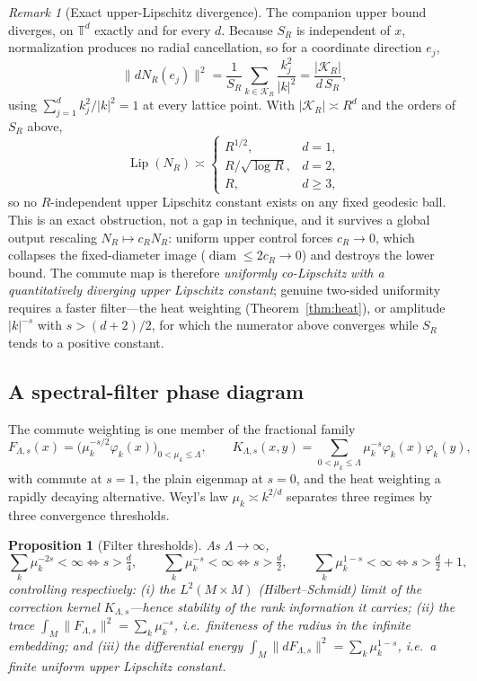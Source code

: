 \documentclass[11pt]{article}
\newtheorem{proposition}[theorem]{Proposition}
\theoremstyle{remark}
\newtheorem*{remark}{Remark}
\begin{document}
\begin{remark}[Exact upper-Lipschitz divergence]\label{rem:torus-upper}
The companion upper bound diverges, on $\mathbb T^d$ exactly and for every $d$.
Because $S_R$ is independent of $x$, normalization produces no radial cancellation,
so for a coordinate direction $e_j$,
\[
\lVert dN_R(e_j)\rVert^2=\frac1{S_R}\sum_{k\in\mathcal K_R}\frac{k_j^2}{\lvert k\rvert^2}
=\frac{\lvert\mathcal K_R\rvert}{d\,S_R},
\]
using $\sum_{j=1}^d k_j^2/\lvert k\rvert^2=1$ at every lattice point. With
$\lvert\mathcal K_R\rvert\asymp R^d$ and the orders of $S_R$ above,
\[
\operatorname{Lip}(N_R)\asymp
\begin{cases}
R^{1/2}, & d=1,\\
R/\sqrt{\log R}, & d=2,\\
R, & d\ge3,
\end{cases}
\]
so no $R$-independent upper Lipschitz constant exists on any fixed geodesic ball.
This is an exact obstruction, not a gap in technique, and it survives a global
output rescaling $N_R\mapsto c_RN_R$: uniform upper control forces $c_R\to0$, which
collapses the fixed-diameter image ($\operatorname{diam}\le2c_R\to0$) and destroys
the lower bound. The commute map is therefore \emph{uniformly co-Lipschitz with a
quantitatively diverging upper Lipschitz constant}; genuine two-sided uniformity
requires a faster filter---the heat weighting (Theorem~\ref{thm:heat}), or amplitude
$\lvert k\rvert^{-s}$ with $s>(d+2)/2$, for which the numerator above converges while
$S_R$ tends to a positive constant.
\end{remark}

\subsection*{A spectral-filter phase diagram}
The commute weighting is one member of the fractional family
\[
F_{\Lambda,s}(x)=\bigl(\mu_k^{-s/2}\varphi_k(x)\bigr)_{0<\mu_k\le\Lambda},
\qquad
K_{\Lambda,s}(x,y)=\sum_{0<\mu_k\le\Lambda}\mu_k^{-s}\varphi_k(x)\varphi_k(y),
\]
with commute at $s=1$, the plain eigenmap at $s=0$, and the heat weighting a
rapidly decaying alternative. Weyl's law $\mu_k\asymp k^{2/d}$ separates three regimes
by three convergence thresholds.

\begin{proposition}[Filter thresholds]\label{prop:phase}
As $\Lambda\to\infty$,
\[
\sum_k\mu_k^{-2s}<\infty\iff s>\tfrac d4,\qquad
\sum_k\mu_k^{-s}<\infty\iff s>\tfrac d2,\qquad
\sum_k\mu_k^{1-s}<\infty\iff s>\tfrac d2+1,
\]
controlling respectively: (i) the $L^2(M\times M)$ (Hilbert--Schmidt) limit of the
correction kernel $K_{\Lambda,s}$---hence stability of the rank information it carries;
(ii) the trace $\int_M\lVert F_{\Lambda,s}\rVert^2=\sum_k\mu_k^{-s}$, i.e.\ finiteness
of the radius in the infinite embedding; and (iii) the differential energy
$\int_M\lVert dF_{\Lambda,s}\rVert^2=\sum_k\mu_k^{1-s}$, i.e.\ a finite uniform upper
Lipschitz constant.
\end{proposition}
\end{document}
